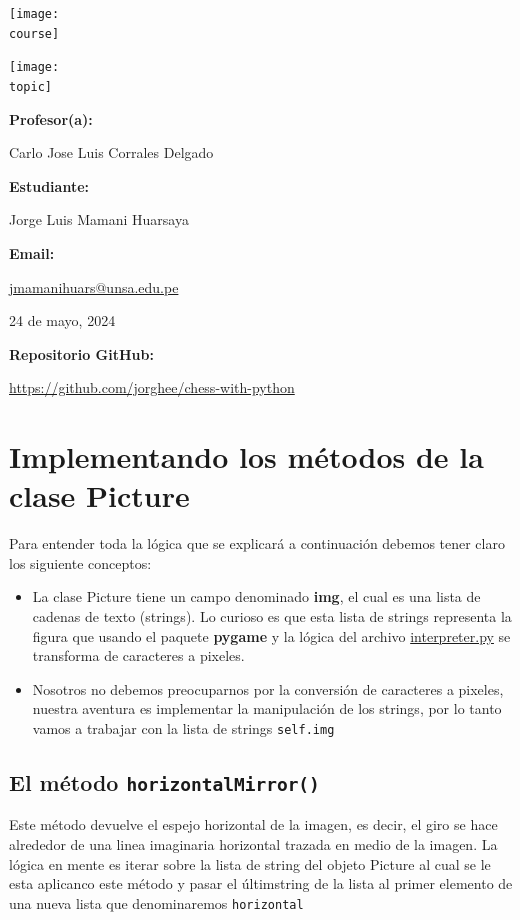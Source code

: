 \documentclass[10pt, a4paper]{article}
\makeatletter
\newcommand{\mintpython}[1]{\texttt{#1}}
\newcommand{\course}{img/web_programming.png}
\newcommand{\topic}{img/python.png}
\newcommand{\professor}{Carlo Jose Luis Corrales Delgado}
\newcommand{\student}{Jorge Luis Mamani Huarsaya}
\newcommand{\email}{https://mail.google.com/mail/u/0/?fs=1&tf=cm&source=mailto&to=jmamanihuars@unsa.edu.pe}
\newcommand{\github}{https://github.com/jorghee/chess-with-python}
\newcommand{\mydate}{24 de mayo, 2024}
\makeatother
\begin{document}
\begin{titlepage}
	\centering
	\texttt{[image: \\course]} \par
  \vfill \vfill
	\texttt{[image: \\topic]}\par
  \vfill \vfill
  {\textbf{Profesor(a):} \par}
	\professor \vfill
  {\textbf{Estudiante:} \par}
	\student \vfill
  {\textbf{Email:} \par}
  \href{\email}{jmamanihuars@unsa.edu.pe} \vfill
	{\large \mydate \par}
  {\textbf{Repositorio GitHub:} \par}
  \href{\github}{\github} \vfill
\end{titlepage}

\section{Implementando los métodos de la clase Picture}
Para entender toda la lógica que se explicará a continuación debemos tener claro los siguiente conceptos:

\begin{itemize}
  \item La clase Picture tiene un campo denominado \textbf{img}, el cual es una lista de cadenas de texto (strings). Lo curioso es que esta lista de strings representa la figura que usando el paquete \textbf{pygame} y la lógica del archivo \href{https://github.com/jorghee/chess-with-python/blob/main/interpreter.py}{interpreter.py} se transforma de caracteres a pixeles.
  \item Nosotros no debemos preocuparnos por la conversión de caracteres a pixeles, nuestra aventura es implementar la manipulación de los strings, por lo tanto vamos a trabajar con la lista de strings \mintpython{self.img}
\end{itemize}

\subsection{El método \mintpython{horizontalMirror()}}
Este método devuelve el espejo horizontal de la imagen, es decir, el giro se hace alrededor de una linea imaginaria horizontal trazada en medio de la imagen. 
\singlespacing
La lógica en mente es iterar sobre la lista de string del objeto Picture al cual se le esta aplicanco este método y pasar el últimstring de la lista al primer elemento de una nueva lista que denominaremos \mintpython{horizontal}
\end{document}
